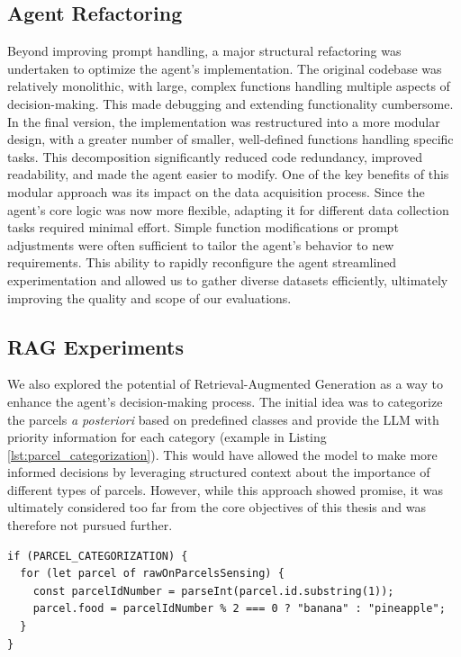 \subsection{Agent Refactoring}
Beyond improving prompt handling, a major structural refactoring was undertaken to
optimize the agent's implementation. The original codebase was relatively
monolithic, with large, complex functions handling multiple aspects of decision-making.
This made debugging and extending functionality cumbersome. In the final version,
the implementation was restructured into a more modular design, with a greater
number of smaller, well-defined functions handling specific tasks. This
decomposition significantly reduced code redundancy, improved readability, and
made the agent easier to modify. One of the key benefits of this modular approach
was its impact on the data acquisition process. Since the agent's core logic was
now more flexible, adapting it for different data collection tasks required minimal
effort. Simple function modifications or prompt adjustments were often
sufficient to tailor the agent's behavior to new requirements. This ability to rapidly
reconfigure the agent streamlined experimentation and allowed us to gather diverse
datasets efficiently, ultimately improving the quality and scope of our
evaluations.

\subsection{RAG Experiments}
We also explored the potential of Retrieval-Augmented Generation as a way to
enhance the agent's decision-making process. The initial idea was to categorize the
parcels \emph{a posteriori} based on predefined classes and provide the LLM with
priority information for each category (example in Listing \ref{lst:parcel_categorization}).
This would have allowed the model to make more informed decisions by leveraging structured
context about the importance of different types of parcels. However, while this approach
showed promise, it was ultimately considered too far from the core objectives of
this thesis and was therefore not pursued further.

\vspace{1mm}
\begin{codewindow}
    \begin{lstlisting}
if (PARCEL_CATEGORIZATION) {
  for (let parcel of rawOnParcelsSensing) {
    const parcelIdNumber = parseInt(parcel.id.substring(1));
    parcel.food = parcelIdNumber % 2 === 0 ? "banana" : "pineapple";
  }
}
\end{lstlisting}
\end{codewindow}
\vspace{1mm}

